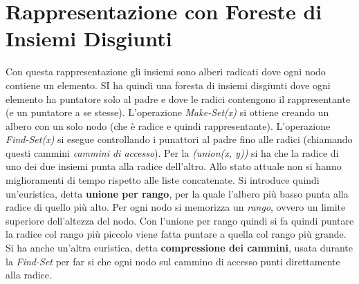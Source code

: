 \documentclass[a4paper,12pt, oneside]{book}
\begin{document}
\section{Rappresentazione con Foreste di Insiemi Disgiunti}
Con questa rappresentazione gli insiemi sono alberi radicati dove ogni
nodo contiene un elemento. SI ha quindi una foresta di insiemi
disgiunti dove ogni elemento ha puntatore solo al padre e dove le
radici contengono il rappresentante (e un puntatore a se
stesse). L'operazione \textit{Make-Set(x)} si ottiene creando un
albero con un solo nodo (che è radice e quindi
rappresentante). L'operazione \textit{Find-Set(x)} si esegue
controllando i punattori al padre fino alle radici (chiamando questi
cammini \textit{cammini di accesso}). Per la \textit{(union(x, y))} si
ha che la radice di uno dei due insiemi punta alla radice
dell'altro. Allo stato attuale non si hanno miglioramenti di tempo
rispetto alle liste concatenate. Si introduce quindi un'euristica,
detta \textbf{unione per rango}, per la quale l'albero più basso punta
alla radice di quello più alto. Per ogni nodo si memorizza un
\textit{rango}, ovvero un limite superiore dell'altezza del nodo. Con
l'unione per rango quindi si fa quindi puntare la radice col rango più
piccolo viene fatta puntare a quella col rango più grande. \\
Si ha anche un'altra euristica, detta \textbf{compressione dei
  cammini}, usata durante la \textit{Find-Set} per far si che ogni
nodo sul cammino di accesso punti direttamente alla radice.
\end{document}
